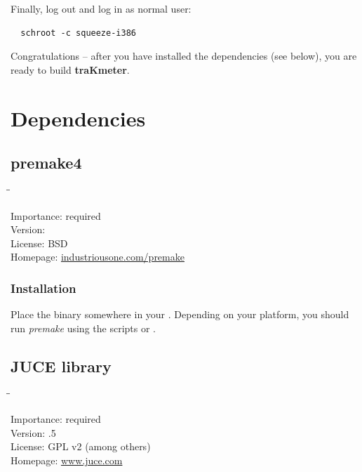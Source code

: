 Finally, log out and log in as normal user:

\begin{verbatim}
  schroot -c squeeze-i386
\end{verbatim}

Congratulations -- after you have installed the dependencies (see
below), you are ready to build \textbf{traKmeter}.

\section{Dependencies}

\subsection{premake4}

\begin{tabbing}
  \hspace*{6em}\=\=\kill

  Importance:  \> required \\
  Version:      \\
  License:     \> BSD \\
  Homepage:    \> \href{http://industriousone.com/premake}{industriousone.com/premake}
\end{tabbing}

\subsubsection{Installation}

Place the binary somewhere in your .  Depending on your
platform, you should run \emph{premake} using the scripts
 or .

\subsection{JUCE library}

\begin{tabbing}
  \hspace*{6em}\=\=\kill

  Importance:  \> required \\
  Version:     .5 \\
  License:     \> GPL v2 (among others) \\
  Homepage:    \> \href{http://www.juce.com/}{www.juce.com}
\end{tabbing}


